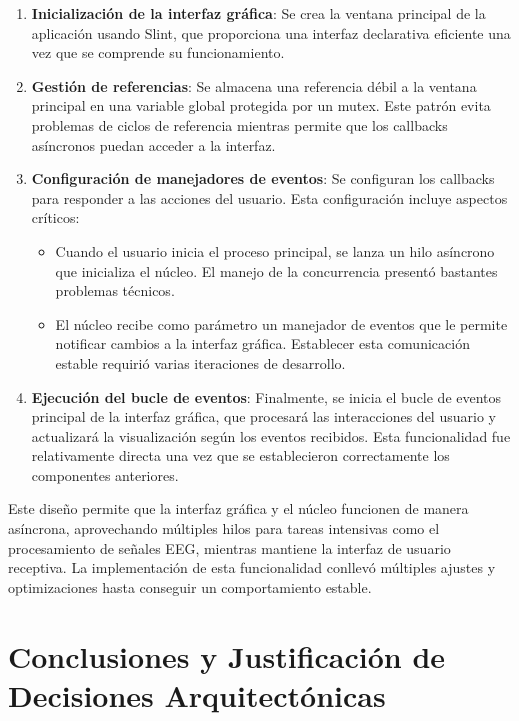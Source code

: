 \begin{enumerate}
\begin{enumerate}
    \item \textbf{Inicialización de la interfaz gráfica}: Se crea la ventana principal de la aplicación usando Slint, que proporciona una interfaz declarativa eficiente una vez que se comprende su funcionamiento.
    
    \item \textbf{Gestión de referencias}: Se almacena una referencia débil a la ventana principal en una variable global protegida por un mutex. Este patrón evita problemas de ciclos de referencia mientras permite que los callbacks asíncronos puedan acceder a la interfaz.
    
    \item \textbf{Configuración de manejadores de eventos}: Se configuran los callbacks para responder a las acciones del usuario. Esta configuración incluye aspectos críticos:
    \begin{itemize}
        \item Cuando el usuario inicia el proceso principal, se lanza un hilo asíncrono que inicializa el núcleo. El manejo de la concurrencia presentó bastantes problemas técnicos.
        \item El núcleo recibe como parámetro un manejador de eventos que le permite notificar cambios a la interfaz gráfica. Establecer esta comunicación estable requirió varias iteraciones de desarrollo.
    \end{itemize}
    
    \item \textbf{Ejecución del bucle de eventos}: Finalmente, se inicia el bucle de eventos principal de la interfaz gráfica, que procesará las interacciones del usuario y actualizará la visualización según los eventos recibidos. Esta funcionalidad fue relativamente directa una vez que se establecieron correctamente los componentes anteriores.
\end{enumerate}

Este diseño permite que la interfaz gráfica y el núcleo funcionen de manera asíncrona, aprovechando múltiples hilos para tareas intensivas como el procesamiento de señales EEG, mientras mantiene la interfaz de usuario receptiva. La implementación de esta funcionalidad conllevó múltiples ajustes y optimizaciones hasta conseguir un comportamiento estable.

\newpage
\section{Conclusiones y Justificación de Decisiones Arquitectónicas}


\end{enumerate}
